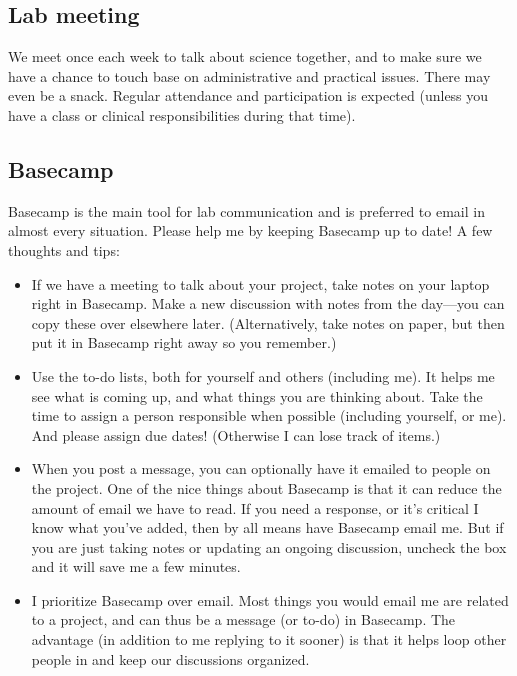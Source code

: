 \documentclass[letterpaper,12pt,oneside]{memoir}
\begin{document}
\subsection{Lab meeting}
We meet once each week to talk about science together, and to make sure we have a chance to touch base on administrative and practical issues. There may even be a snack. Regular attendance and participation is expected (unless you have a class or clinical responsibilities during that time).


\subsection{Basecamp}
Basecamp is the main tool for lab communication and is preferred to email in almost every situation. Please help me by keeping Basecamp up to date! A few thoughts and tips:

\begin{itemize}
\item If we have a meeting to talk about your project, take notes on your laptop right in Basecamp. Make a new discussion with notes from the day---you can copy these over elsewhere later. (Alternatively, take notes on paper, but then put it in Basecamp right away so you remember.)

\item Use the to-do lists, both for yourself and others (including me). It helps me see what is coming up, and what things you are thinking about. Take the time to assign a person responsible when possible (including yourself, or me). And please assign due dates! (Otherwise I can lose track of items.)

\item When you post a message, you can optionally have it emailed to people on the project. One of the nice things about Basecamp is that it can reduce the amount of email we have to read. If you need a response, or it's critical I know what you've added, then by all means have Basecamp email me. But if you are just taking notes or updating an ongoing discussion, uncheck the box and it will save me a few minutes.

\item I prioritize Basecamp over email. Most things you would email me are related to a project, and can thus be a message (or to-do) in Basecamp. The advantage (in addition to me replying to it sooner) is that it helps loop other people in and keep our discussions organized.

\end{itemize}
\end{document}
